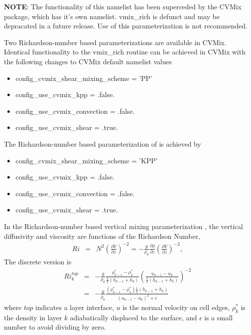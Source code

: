 \textbf{NOTE}: The functionality of this namelist has been superceded by the CVMix package, which has it's own namelist.  vmix\_rich is defunct and may be depracated in a future release.  Use of this parameterization is not recommended.

Two Richardson-number based parameterizations are available in CVMix.  Identical functionality to the vmix\_rich routine \citep{Pacanowski_Philander81jpo} can be achieved in CVMix with the following changes to CVMix default namelist values
\begin{itemize}
	\item config\_cvmix\_shear\_mixing\_scheme = 'PP'
	\item config\_use\_cvmix\_kpp = .false.
	\item config\_use\_cvmix\_convection = .false.
	\item config\_use\_cvmix\_shear = .true.
\end{itemize}

The Richardson-number based parameterization of \cite{Large:1994ua} is achieved by 
\begin{itemize}
	\item config\_cvmix\_shear\_mixing\_scheme = 'KPP'
	\item config\_use\_cvmix\_kpp = .false.
	\item config\_use\_cvmix\_convection = .false.
	\item config\_use\_cvmix\_shear = .true.
\end{itemize}

In the Richardson-number based vertical mixing parameterization \citep[\textit{e.g.},][]{Pacanowski_Philander81jpo}, the vertical diffusivity and viscosity are functions of the Richardson Number,
\begin{eqnarray}   
\label{ocean:\mode_Ri1}
Ri &=& N^2
\left(\frac{\partial V}{\partial z} \right)^{-2}
 = -\frac{g}{\rho_0}\frac{\partial \rho}{\partial z}
\left(\frac{\partial V}{\partial z} \right)^{-2},
\end{eqnarray}
The discrete version is
\begin{eqnarray}   
Ri^{top}_k &=& -\frac{g}{\rho_0}\frac{\rho^*_{k-1}-\rho^*_k}{\frac{1}{2}(h_{k-1}+h_k)}
\left(\frac{u_{k-1}-u_k}{\frac{1}{2}(h_{k-1}+h_k)}\right)^{-2}\\
 &=& -\frac{g}{\rho_0}\frac{(\rho^*_{k-1}-\rho^*_k)\frac{1}{2}(h_{k-1}+h_k)}
{(u_{k-1}-u_k)^2+\epsilon}
\end{eqnarray}
where $top$ indicates a layer interface, $u$ is the normal velocity on cell edges, $\rho^*_k$ is the density in layer $k$ adiabatically displaced to the surface, and $\epsilon$ is a small number to avoid dividing by zero.  

